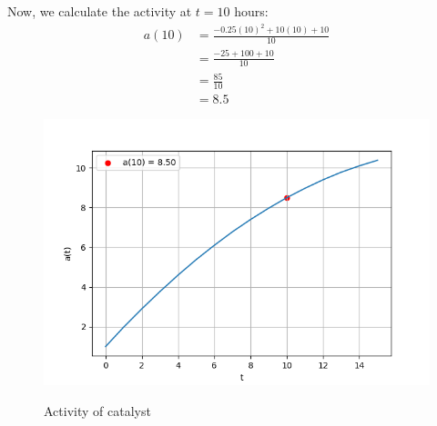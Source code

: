 \documentclass[journal,12pt,twocolumn]{IEEEtran}
\theoremstyle{remark}
\begin{document}
Now, we calculate the activity at $t = 10$ hours:\\
\begin{align}
a(10) &= \frac{-0.25(10)^2 + 10(10) + 10}{10} \\
 &= \frac{-25 + 100 + 10}{10} \\
 &= \frac{85}{10} \\
 &= 8.5
\end{align}
\begin{figure}[h!]
\centering
\includegraphics[width=\columnwidth]{figs/gate_plot.png}
\label{fig:plot}
\caption{Activity of catalyst}
\end{figure}
\end{document}
